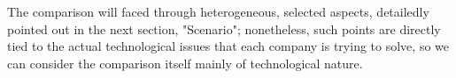 The comparison will faced through heterogeneous, selected aspects, detailedly pointed out in the next section, "Scenario"; nonetheless, such points are directly tied to the actual technological issues that each company is trying to solve, so we can consider the comparison itself mainly of technological nature.